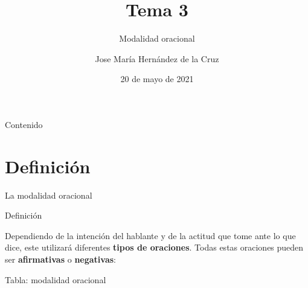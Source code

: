 \documentclass[ignorenonframetext,]{beamer}
\title{Tema 3}
\subtitle{Modalidad oracional}
\author{Jose María Hernández de la Cruz}
\date{20 de mayo de 2021}
\begin{document}
\frame{\titlepage}

\begin{frame}{Contenido}
\protect\hypertarget{contenido}{}

\tableofcontents

\end{frame}

\hypertarget{definiciuxf3n}{%
\section{Definición}\label{definiciuxf3n}}

\begin{frame}{La modalidad oracional}
\protect\hypertarget{la-modalidad-oracional}{}

\begin{block}{Definición}

Dependiendo de la intención del hablante y de la actitud que tome ante
lo que dice, este utilizará diferentes \textbf{tipos de oraciones}.
Todas estas oraciones pueden ser \textbf{afirmativas} o
\textbf{negativas}:

\end{block}

\begin{block}{Tabla: modalidad oracional}


\end{block}
\end{frame}
\end{document}
